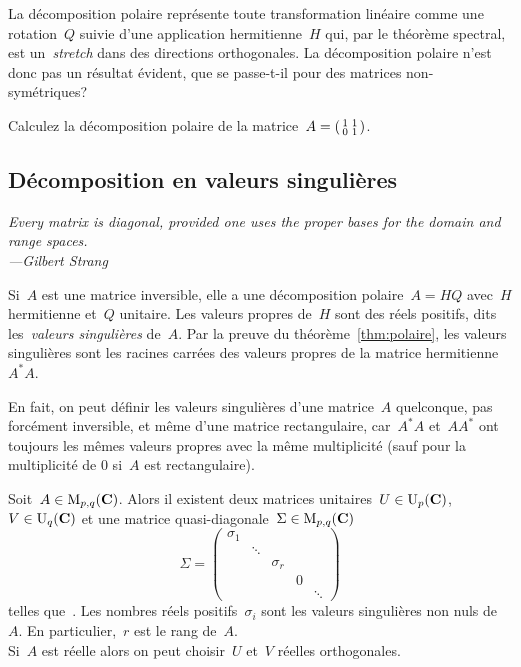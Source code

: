 La décomposition polaire représente toute transformation linéaire comme une
rotation~$Q$ suivie d'une application hermitienne~$H$ qui, par le théorème
spectral, est un~\emph{stretch} dans des directions orthogonales.  La
décomposition polaire n'est donc pas un résultat évident, que se passe-t-il
pour des matrices non-symétriques?

\begin{exercice}[difficile]
	Calculez la décomposition polaire de la
	matrice~$A=\left(\begin{smallmatrix}1&1\\0&1\end{smallmatrix}\right)$.
\end{exercice}

\subsection{Décomposition en valeurs singulières}

\emph{\small Every matrix is diagonal, provided one uses the proper bases for
the domain and range spaces.\\ \hfill---Gilbert Strang}

Si~$A$ est une matrice inversible, elle a une décomposition
polaire~$A=HQ$ avec~$H$ hermitienne et~$Q$ unitaire.  Les valeurs propres
de~$H$ sont des réels positifs, dits les~\emph{valeurs singulières} de~$A$.
Par la preuve du théorème~\ref{thm:polaire}, les valeurs singulières sont les
racines carrées des valeurs propres de la matrice hermitienne~$A^*A$.

En fait, on peut définir les valeurs singulières d'une matrice~$A$
quelconque, pas forcément inversible, et même d'une matrice rectangulaire,
car~$A^*A$ et~$AA^*$ ont toujours les mêmes valeurs propres avec la même
multiplicité (sauf pour la multiplicité de $0$ si~$A$ est rectangulaire).

\begin{theorem}
	\label{thm:svd}
	Soit~$A\in\mathrm{M}_{p,q}(\mathbf{C})$.  Alors il existent deux matrices unitaires~$U\in
	\mathrm{U}_p(\mathbf{C})$, $V\in\mathrm{U}_q(\mathbf{C})$ et une matrice quasi-diagonale~$\Sigma\in
	\mathrm{M}_{p,q}(\mathbf{C})$
	\[
		\Sigma = \begin{pmatrix}
			\sigma_1 & & & & \\
			 & \ddots & & & \\
			 & & \sigma_r & & \\
			 & & & 0 & \\
			 & & & & \ddots
		\end{pmatrix}
	\]
	telles que~.  Les nombres réels
	positifs~$\sigma_i$ sont les valeurs singulières non nuls de~$A$.  En
	particulier,~$r$ est le rang de~$A$. \\
	Si~$A$ est réelle alors on peut choisir~$U$ et~$V$ réelles orthogonales.
\end{theorem}

